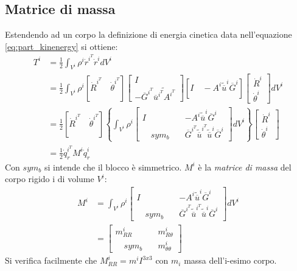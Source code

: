 \subsection{Matrice di massa}
Estendendo ad un corpo la definizione di energia cinetica data nell'equazione \ref{eq:part_kinenergy} si ottiene:
\begin{align} \label{eq:body_kinenergy}
T^i &= \frac{1}{2}\int_{V^i}\rho^i\dot{r}^{i^T} \dot{r}^idV^i 
\\ &= \frac{1}{2}\int_{V^i}\rho^i [\dot{R}^{i^T}\quad \dot{\theta}^{i^T}] \begin{bmatrix}I \\ - \overline{G}^{i^T}\tilde{\overline{u}^{i^T}A^{i^T}} \end{bmatrix} [I \quad -A^i\tilde{\overline{u}}^i\overline{G}^i] \begin{bmatrix} \dot{R}^i \\ \dot{\theta}^i \end{bmatrix}  dV^i \nonumber \\ &= \frac{1}{2}[\dot{R}^{i^T}\quad \dot{\theta}^{i^T}]\left\{\int_{V^i}\rho^i \begin{bmatrix}
I & -A^i\tilde{\overline{u}}^i\overline{G}^i \\ \quad sym_b \quad & \overline{G}^{i^T}\tilde{\overline{u}}^{i^T}\tilde{\overline{u}}^i\overline{G}^i
\end{bmatrix}  dV^i\right\} \begin{bmatrix} \dot{R}^i \\ \dot{\theta}^i \end{bmatrix} \nonumber
\\ &= \frac{1}{2}\dot{q}_r^{i^T}M^i\dot{q}_r^i
\end{align}
Con $sym_b$ si intende che il blocco è simmetrico.
$M^i$ è la \emph{matrice di massa} del corpo rigido i di volume $V^i$:
\begin{align}
M^i &= \int_{V^i}\rho^i \begin{bmatrix}
I & -A^i\tilde{\overline{u}}^i\overline{G}^i \\ \quad sym_b \quad & \overline{G}^{i^T}\tilde{\overline{u}}^{i^T}\tilde{\overline{u}}^i\overline{G}^i \end{bmatrix}  dV^i \\
&= \begin{bmatrix} m^i_{RR} & m^i_{R\theta} \\ \quad sym_b\quad &m^i_{\theta\theta}  \end{bmatrix} \end{align}
Si verifica facilmente che $M^i_{RR} = m^iI^{3x3}$ con $m_i$ massa dell'i-esimo corpo.
